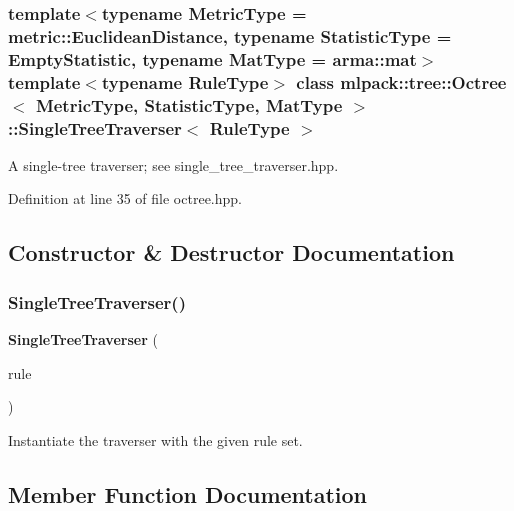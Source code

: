 \subsubsection*{template$<$typename Metric\+Type = metric\+::\+Euclidean\+Distance, typename Statistic\+Type = Empty\+Statistic, typename Mat\+Type = arma\+::mat$>$\newline
template$<$typename Rule\+Type$>$\newline
class mlpack\+::tree\+::\+Octree$<$ Metric\+Type, Statistic\+Type, Mat\+Type $>$\+::\+Single\+Tree\+Traverser$<$ Rule\+Type $>$}

A single-\/tree traverser; see single\+\_\+tree\+\_\+traverser.\+hpp. 

Definition at line 35 of file octree.\+hpp.



\subsection{Constructor \& Destructor Documentation}
\mbox{\label{classmlpack_1_1tree_1_1Octree_1_1SingleTreeTraverser_aef3b0527dc7ff514b7b658b1108abae9}} 
\subsubsection{Single\+Tree\+Traverser()}
{\footnotesize\ttfamily \textbf{ Single\+Tree\+Traverser} (\begin{DoxyParamCaption}\item[{Rule\+Type \&}]{rule }\end{DoxyParamCaption})}



Instantiate the traverser with the given rule set. 



\subsection{Member Function Documentation}
\mbox{\label{classmlpack_1_1tree_1_1Octree_1_1SingleTreeTraverser_ac2f6072011ee31a0a32f62e2a105a347}} 
